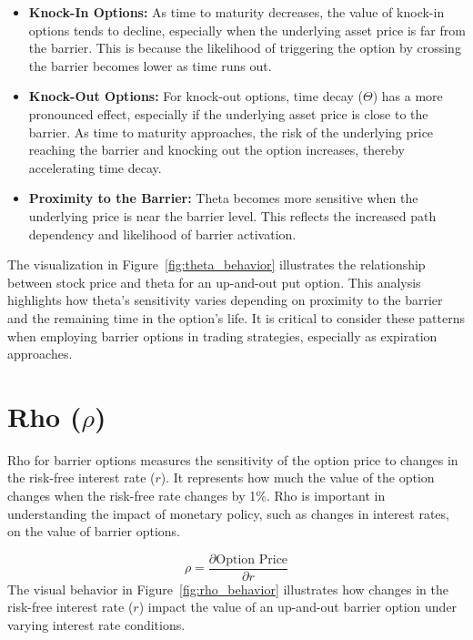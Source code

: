 \begin{itemize}
    \item \textbf{Knock-In Options:} As time to maturity decreases, the value of knock-in options tends to decline, especially when the underlying asset price is far from the barrier. This is because the likelihood of triggering the option by crossing the barrier becomes lower as time runs out.
    
    \item \textbf{Knock-Out Options:} For knock-out options, time decay (\(\Theta\)) has a more pronounced effect, especially if the underlying asset price is close to the barrier. As time to maturity approaches, the risk of the underlying price reaching the barrier and knocking out the option increases, thereby accelerating time decay.
    
    \item \textbf{Proximity to the Barrier:} Theta becomes more sensitive when the underlying price is near the barrier level. This reflects the increased path dependency and likelihood of barrier activation.
\end{itemize}

The visualization in Figure~\ref{fig:theta_behavior} illustrates the relationship between stock price and theta for an up-and-out put option. This analysis highlights how theta's sensitivity varies depending on proximity to the barrier and the remaining time in the option's life. It is critical to consider these patterns when employing barrier options in trading strategies, especially as expiration approaches.


\section{Rho (\(\rho\))}

Rho for barrier options measures the sensitivity of the option price to changes in the risk-free interest rate (\(r\)). It represents how much the value of the option changes when the risk-free rate changes by 1\%. Rho is important in understanding the impact of monetary policy, such as changes in interest rates, on the value of barrier options.

\[
\rho = \frac{\partial \text{Option Price}}{\partial r}
\]
The visual behavior in Figure~\ref{fig:rho_behavior} illustrates how changes in the risk-free interest rate (\(r\)) impact the value of an up-and-out barrier option under varying interest rate conditions. 

